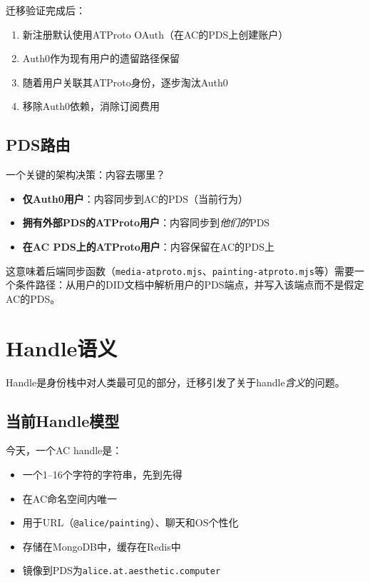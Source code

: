 \documentclass[10pt,letterpaper,twocolumn]{article}
\begin{document}
迁移验证完成后：

\begin{enumerate}
  \item 新注册默认使用ATProto OAuth（在AC的PDS上创建账户）
  \item Auth0作为现有用户的遗留路径保留
  \item 随着用户关联其ATProto身份，逐步淘汰Auth0
  \item 移除Auth0依赖，消除订阅费用
\end{enumerate}

\subsection{PDS路由}

一个关键的架构决策：内容去哪里？

\begin{itemize}
  \item \textbf{仅Auth0用户}：内容同步到AC的PDS（当前行为）
  \item \textbf{拥有外部PDS的ATProto用户}：内容同步到\emph{他们的}PDS
  \item \textbf{在AC PDS上的ATProto用户}：内容保留在AC的PDS上
\end{itemize}

这意味着后端同步函数（\texttt{media-atproto.mjs}、\texttt{painting-atproto.mjs}等）需要一个条件路径：从用户的DID文档中解析用户的PDS端点，并写入该端点而不是假定AC的PDS。


\section{Handle语义}
\label{sec:handles}

Handle是身份栈中对人类最可见的部分，迁移引发了关于handle\emph{含义}的问题。

\subsection{当前Handle模型}

今天，一个AC handle是：
\begin{itemize}
  \item 一个1--16个字符的字符串，先到先得
  \item 在AC命名空间内唯一
  \item 用于URL（\texttt{@alice/painting}）、聊天和OS个性化
  \item 存储在MongoDB中，缓存在Redis中
  \item 镜像到PDS为\texttt{alice.at.aesthetic.computer}
\end{itemize}
\end{document}
